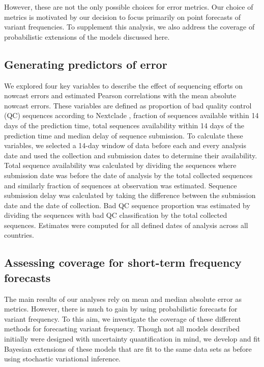 However, these are not the only possible choices for error metrics.
Our choice of metrics is motivated by our decision to focus primarily on point forecasts of variant frequencies.
To supplement this analysis, we also address the coverage of probabilistic extensions of the models discussed here.

\subsection*{Generating predictors of error}

We explored four key variables to describe the effect of sequencing efforts on nowcast errors and estimated Pearson correlations with the mean absolute nowcast errors.
These variables are defined as proportion of bad quality control (QC) sequences according to Nextclade \cite{aksamentov2021nextclade}, fraction of sequences available within 14 days of the prediction time, total sequences availability within 14 days of the prediction time and median delay of sequence submission.
To calculate these variables, we selected a 14-day window of data before each and every analysis date and used the collection and submission dates to determine their availability.
Total sequence availability was calculated by dividing the sequences where submission date was before the date of analysis by the total collected sequences and similarly fraction of sequences at observation was estimated.
Sequence submission delay was calculated by taking the difference between the submission date and the date of collection.
Bad QC sequence proportion was estimated by dividing the sequences with bad QC classification by the total collected sequences.
Estimates were computed for all defined dates of analysis across all countries.

\subsection*{Assessing coverage for short-term frequency forecasts}

The main results of our analyses rely on mean and median absolute error as metrics.
However, there is much to gain by using probabilistic forecasts for variant frequency.
To this aim, we investigate the coverage of these different methods for forecasting variant frequency.
Though not all models described initially were designed with uncertainty quantification in mind, we develop and fit Bayesian extensions of these models that are fit to the same data sets as before using stochastic variational inference.

